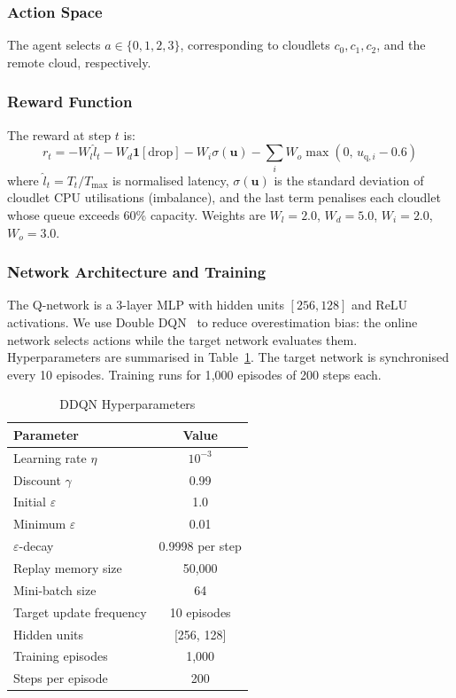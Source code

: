 \documentclass[conference]{IEEEtran}
\begin{document}
\subsubsection{Action Space}

The agent selects $a \in \{0, 1, 2, 3\}$, corresponding to cloudlets
$c_0, c_1, c_2$, and the remote cloud, respectively.

\subsubsection{Reward Function}

The reward at step $t$ is:
\begin{equation}
r_t = -W_l \hat{l}_t - W_d \mathbf{1}[\text{drop}] -
      W_i \sigma(\mathbf{u}) - \sum_{i} W_o \max(0,\, u_{\text{q},i} - 0.6)
\label{eq:reward}
\end{equation}
where $\hat{l}_t = T_t / T_{\max}$ is normalised latency,
$\sigma(\mathbf{u})$ is the standard deviation of cloudlet CPU
utilisations (imbalance), and the last term penalises each cloudlet
whose queue exceeds 60\% capacity. Weights are
$W_l{=}2.0$, $W_d{=}5.0$, $W_i{=}2.0$, $W_o{=}3.0$.

\subsubsection{Network Architecture and Training}

The Q-network is a 3-layer MLP with hidden units $[256, 128]$ and ReLU
activations. We use Double DQN~\cite{vandehasselt2016ddqn} to reduce
overestimation bias: the online network selects actions while the target
network evaluates them. Hyperparameters are summarised in
Table~\ref{tab:hyperparams}. The target network is synchronised every
10 episodes. Training runs for 1{,}000 episodes of 200 steps each.

\begin{table}[htbp]
\centering
\caption{DDQN Hyperparameters}
\label{tab:hyperparams}
\begin{tabular}{lc}
\toprule
\textbf{Parameter} & \textbf{Value} \\
\midrule
Learning rate $\eta$        & $10^{-3}$ \\
Discount $\gamma$           & 0.99 \\
Initial $\varepsilon$       & 1.0 \\
Minimum $\varepsilon$       & 0.01 \\
$\varepsilon$-decay         & 0.9998 per step \\
Replay memory size          & 50{,}000 \\
Mini-batch size             & 64 \\
Target update frequency     & 10 episodes \\
Hidden units                & [256, 128] \\
Training episodes           & 1{,}000 \\
Steps per episode           & 200 \\
\bottomrule
\end{tabular}
\end{table}
\end{document}
